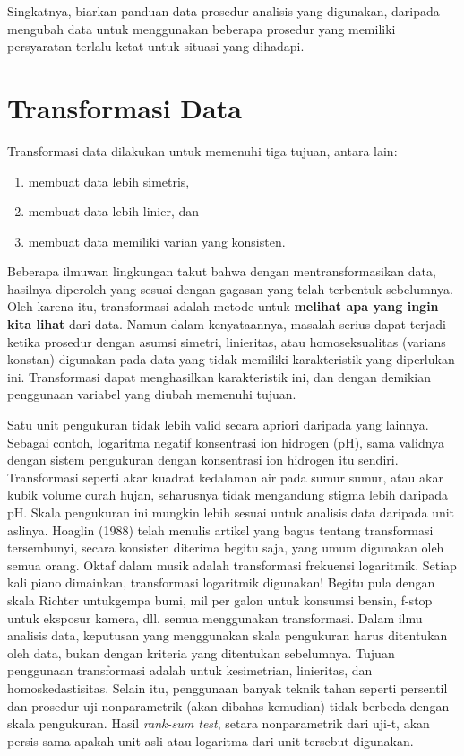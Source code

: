 \documentclass[]{book}
\providecommand{\tightlist}{%
  \setlength{\itemsep}{0pt}\setlength{\parskip}{0pt}}
\begin{document}
Singkatnya, biarkan panduan data prosedur analisis yang digunakan,
daripada mengubah data untuk menggunakan beberapa prosedur yang memiliki
persyaratan terlalu ketat untuk situasi yang dihadapi.

\section{Transformasi Data}\label{transformasi-data-1}

Transformasi data dilakukan untuk memenuhi tiga tujuan, antara lain:

\begin{enumerate}
\def\labelenumi{\arabic{enumi}.}
\tightlist
\item
  membuat data lebih simetris,
\item
  membuat data lebih linier, dan
\item
  membuat data memiliki varian yang konsisten.
\end{enumerate}

Beberapa ilmuwan lingkungan takut bahwa dengan mentransformasikan data,
hasilnya diperoleh yang sesuai dengan gagasan yang telah terbentuk
sebelumnya. Oleh karena itu, transformasi adalah metode untuk
\textbf{melihat apa yang ingin kita lihat} dari data. Namun dalam
kenyataannya, masalah serius dapat terjadi ketika prosedur dengan asumsi
simetri, linieritas, atau homoseksualitas (varians konstan) digunakan
pada data yang tidak memiliki karakteristik yang diperlukan ini.
Transformasi dapat menghasilkan karakteristik ini, dan dengan demikian
penggunaan variabel yang diubah memenuhi tujuan.

Satu unit pengukuran tidak lebih valid secara apriori daripada yang
lainnya. Sebagai contoh, logaritma negatif konsentrasi ion hidrogen
(pH), sama validnya dengan sistem pengukuran dengan konsentrasi ion
hidrogen itu sendiri. Transformasi seperti akar kuadrat kedalaman air
pada sumur sumur, atau akar kubik volume curah hujan, seharusnya tidak
mengandung stigma lebih daripada pH. Skala pengukuran ini mungkin lebih
sesuai untuk analisis data daripada unit aslinya. Hoaglin (1988) telah
menulis artikel yang bagus tentang transformasi tersembunyi, secara
konsisten diterima begitu saja, yang umum digunakan oleh semua orang.
Oktaf dalam musik adalah transformasi frekuensi logaritmik. Setiap kali
piano dimainkan, transformasi logaritmik digunakan! Begitu pula dengan
skala Richter untukgempa bumi, mil per galon untuk konsumsi bensin,
f-stop untuk eksposur kamera, dll. semua menggunakan transformasi. Dalam
ilmu analisis data, keputusan yang menggunakan skala pengukuran harus
ditentukan oleh data, bukan dengan kriteria yang ditentukan sebelumnya.
Tujuan penggunaan transformasi adalah untuk kesimetrian, linieritas, dan
homoskedastisitas. Selain itu, penggunaan banyak teknik tahan seperti
persentil dan prosedur uji nonparametrik (akan dibahas kemudian) tidak
berbeda dengan skala pengukuran. Hasil \emph{rank-sum test}, setara
nonparametrik dari uji-t, akan persis sama apakah unit asli atau
logaritma dari unit tersebut digunakan.
\end{document}
